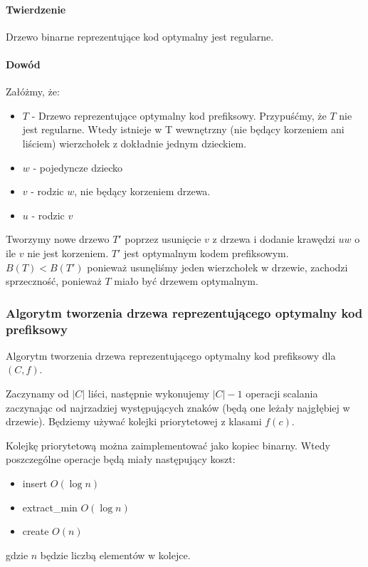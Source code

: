 \paragraph{Twierdzenie}{Drzewo binarne reprezentujące kod optymalny jest regularne.}

\paragraph{Dowód\\}{}
Załóżmy, że:
\begin{itemize}
\item $T$ - Drzewo reprezentujące optymalny kod prefiksowy. Przypuśćmy, że $T$ nie jest regularne. Wtedy istnieje w T wewnętrzny (nie będący korzeniem ani liściem) wierzchołek z dokładnie jednym dzieckiem.
\item $w$ - pojedyncze dziecko
\item $v$ - rodzic $w$, nie będący korzeniem drzewa.
\item $u$ - rodzic $v$
\end{itemize}

Tworzymy nowe drzewo $T'$ poprzez usunięcie $v$ z drzewa i dodanie krawędzi $uw$ o ile $v$ nie jest korzeniem. $T'$ jest optymalnym kodem prefiksowym. 
$B(T) < B(T')$ ponieważ usunęliśmy jeden wierzchołek w drzewie, zachodzi sprzeczność, ponieważ $T$ miało być drzewem optymalnym.

\subsubsection{Algorytm tworzenia drzewa reprezentującego optymalny kod prefiksowy}
Algorytm tworzenia drzewa reprezentującego optymalny kod prefiksowy dla $(C,f)$. 

Zaczynamy od $|C|$ liści, następnie wykonujemy $|C|-1$ operacji scalania zaczynając od najrzadziej występujących znaków (będą one leżały najgłębiej w drzewie). Będziemy używać kolejki priorytetowej z klasami $f(c)$. 

Kolejkę priorytetową można zaimplementować jako kopiec binarny. Wtedy poszczególne operacje będą miały następujący koszt:
\begin{itemize}
\item insert $O(\log n)$ 
\item extract\_min $O(\log n)$
\item create $O(n)$
\end{itemize}
gdzie $n$ będzie liczbą elementów w kolejce.

